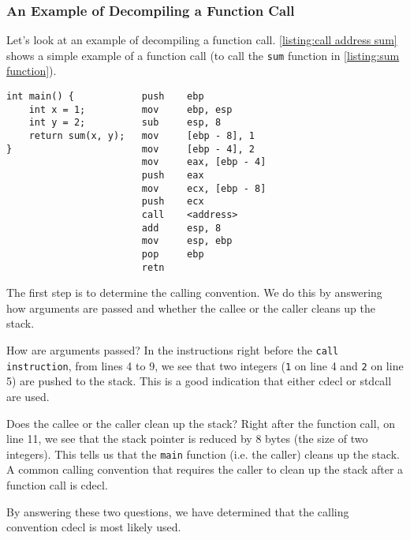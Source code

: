 \subsubsection{An Example of Decompiling a Function Call}
Let's look at an example of decompiling a function call. \autoref{listing:call address sum} shows a simple example of a function call (to call the \texttt{sum} function in \autoref{listing:sum function}).

\begin{minipage}{0.9\textwidth}
\begin{lstlisting}[label={listing:call address sum}, caption={The C and assembly code of a function that calls \autoref{listing:sum function} (using cdecl).}, captionpos=b]
int main() {            push    ebp
    int x = 1;          mov     ebp, esp
    int y = 2;          sub     esp, 8
    return sum(x, y);   mov     [ebp - 8], 1
}                       mov     [ebp - 4], 2
                        mov     eax, [ebp - 4]
                        push    eax
                        mov     ecx, [ebp - 8]
                        push    ecx
                        call    <address>
                        add     esp, 8
                        mov     esp, ebp
                        pop     ebp
                        retn
\end{lstlisting}
\end{minipage}

\medskip

The first step is to determine the calling convention. We do this by answering how arguments are passed and whether the callee or the caller cleans up the stack.

How are arguments passed? In the instructions right before the \texttt{call instruction}, from lines 4 to 9, we see that two integers (\texttt{1} on line 4 and \texttt{2} on line 5) are pushed to the stack. This is a good indication that either cdecl or stdcall are used.

Does the callee or the caller clean up the stack? Right after the function call, on line 11, we see that the stack pointer is reduced by 8 bytes (the size of two integers). This tells us that the \texttt{main} function (i.e. the caller) cleans up the stack. A common calling convention that requires the caller to clean up the stack after a function call is cdecl.

By answering these two questions, we have determined that the calling convention cdecl is most likely used.

\medskip

